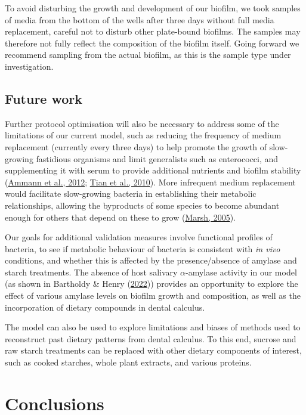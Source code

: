 \documentclass[
  b5paper,
]{book}
\begin{document}
To avoid disturbing the growth and development of our biofilm, we took
samples of media from the bottom of the wells after three days without
full media replacement, careful not to disturb other plate-bound
biofilms. The samples may therefore not fully reflect the composition of
the biofilm itself. Going forward we recommend sampling from the actual
biofilm, as this is the sample type under investigation.

\hypertarget{future-work}{%
\subsection{Future work}\label{future-work}}

Further protocol optimisation will also be necessary to address some of
the limitations of our current model, such as reducing the frequency of
medium replacement (currently every three days) to help promote the
growth of slow-growing fastidious organisms and limit generalists such
as enterococci, and supplementing it with serum to provide additional
nutrients and biofilm stability
(\protect\hyperlink{ref-ammannZurichBiofilm2012}{Ammann et al., 2012};
\protect\hyperlink{ref-tianUsingDGGE2010}{Tian et al., 2010}). More
infrequent medium replacement would facilitate slow-growing bacteria in
establishing their metabolic relationships, allowing the byproducts of
some species to become abundant enough for others that depend on these
to grow (\protect\hyperlink{ref-marshDentalPlaque2005}{Marsh, 2005}).

Our goals for additional validation measures involve functional profiles
of bacteria, to see if metabolic behaviour of bacteria is consistent
with \emph{in vivo} conditions, and whether this is affected by the
presence/absence of amylase and starch treatments. The absence of host
salivary \(\alpha\)-amylase activity in our model (as shown in Bartholdy
\& Henry
(\protect\hyperlink{ref-bartholdyInvestigatingBiases2022}{2022}))
provides an opportunity to explore the effect of various amylase levels
on biofilm growth and composition, as well as the incorporation of
dietary compounds in dental calculus.

The model can also be used to explore limitations and biases of methods
used to reconstruct past dietary patterns from dental calculus. To this
end, sucrose and raw starch treatments can be replaced with other
dietary components of interest, such as cooked starches, whole plant
extracts, and various proteins.

\hypertarget{conclusions}{%
\section{Conclusions}\label{conclusions}}
\end{document}
